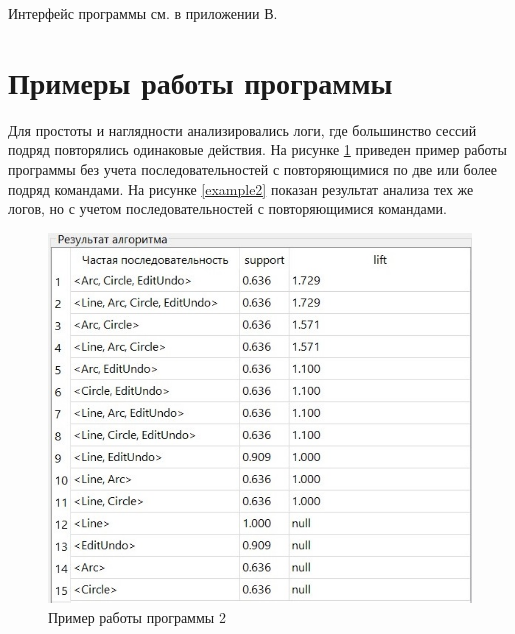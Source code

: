 Интерфейс программы см. в приложении В.



\section{Примеры работы программы}

Для простоты и наглядности анализировались логи, где большинство сессий подряд повторялись одинаковые действия. На рисунке \ref{example1} приведен пример работы программы без учета последовательностей с повторяющимися по две или более подряд командами. На рисунке \ref{example2} показан результат анализа тех же логов, но с учетом последовательностей с повторяющимися командами.



\newpage
\begin{figure}[h!] %
	\centering
	\includegraphics[width=1\textwidth]{inc/img/example1.jpg}
	\caption{Пример работы программы 2}
	\label{example1}
\end{figure}

